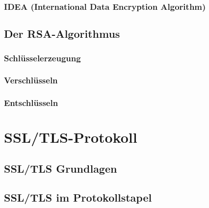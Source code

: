 \documentclass[11pt]{scrartcl}
\begin{document}

\subsubsection{IDEA (International Data Encryption Algorithm)}
\label{sec:international-data-encryption-algorithm}

\subsection{Der RSA-Algorithmus}
\label{sec:rsa-algorithmus}

\subsubsection{Schlüsselerzeugung}
\label{sec:key-generation}

\subsubsection{Verschlüsseln}
\label{sec:rsa-encrypt}

\subsubsection{Entschlüsseln}
\label{sec:rsa-decrypt}

\section{SSL/TLS-Protokoll}
\label{sec:ssl/tls-protocol}

\subsection{SSL/TLS Grundlagen}
\label{sec:ssl-tls-basics}

\subsection{SSL/TLS im Protokollstapel}
\label{sec:ssl-tls-protocolstack}
\end{document}

